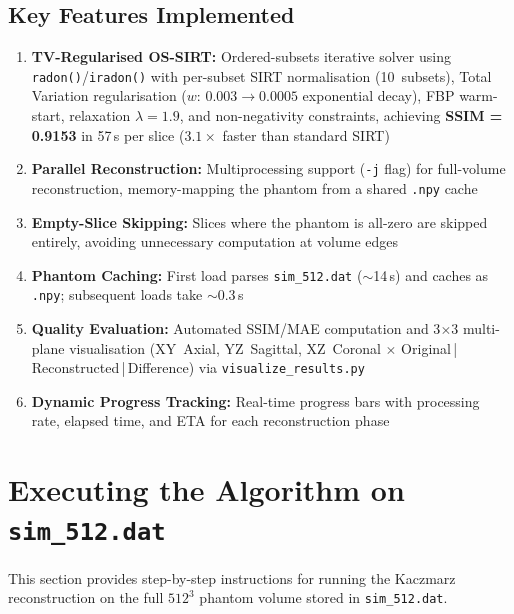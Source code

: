 \documentclass[11pt,a4paper]{article}
\begin{document}
\subsection{Key Features Implemented}

\begin{enumerate}
    \item \textbf{TV-Regularised OS-SIRT:} Ordered-subsets iterative solver using \texttt{radon()}/\texttt{iradon()} with per-subset SIRT normalisation (10~subsets), Total Variation regularisation ($w$: $0.003 \to 0.0005$ exponential decay), FBP warm-start, relaxation $\lambda = 1.9$, and non-negativity constraints, achieving \textbf{SSIM = 0.9153} in 57\,s per slice ($3.1\times$ faster than standard SIRT)
    
    \item \textbf{Parallel Reconstruction:} Multiprocessing support (\texttt{-j} flag) for full-volume reconstruction, memory-mapping the phantom from a shared \texttt{.npy} cache
    
    \item \textbf{Empty-Slice Skipping:} Slices where the phantom is all-zero are skipped entirely, avoiding unnecessary computation at volume edges

    \item \textbf{Phantom Caching:} First load parses \texttt{sim\_512.dat} ($\sim$14\,s) and caches as \texttt{.npy}; subsequent loads take $\sim$0.3\,s
    
    \item \textbf{Quality Evaluation:} Automated SSIM/MAE computation and 3$\times$3 multi-plane visualisation (XY~Axial, YZ~Sagittal, XZ~Coronal $\times$ Original\,|\,Reconstructed\,|\,Difference) via \texttt{visualize\_results.py}
    
    \item \textbf{Dynamic Progress Tracking:} Real-time progress bars with processing rate, elapsed time, and ETA for each reconstruction phase
\end{enumerate}



\section{Executing the Algorithm on \texttt{sim\_512.dat}}

This section provides step-by-step instructions for running the Kaczmarz reconstruction on the full $512^3$ phantom volume stored in \texttt{sim\_512.dat}.
\end{document}
